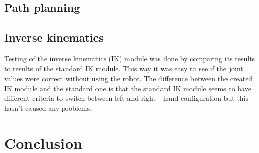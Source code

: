 \documentclass[a4paper, 11pt]{article}
\begin{document}
	\subsection{Path planning}
	
	\subsection{Inverse kinematics}
	Testing of the inverse kinematics (IK) module was done by comparing its results to results of 
	the standard IK module. This way it was easy to see if the joint values were correct 
	without using the robot. The difference between the created IK module and the standard one 
	is that the standard IK module seems to have different criteria to switch between left and right - 
	hand configuration but this hasn't caused any problems.

\section{Conclusion}


    
\end{document}
